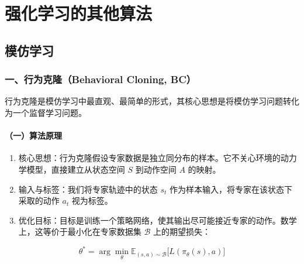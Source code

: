 \hypertarget{ux5f3aux5316ux5b66ux4e60ux7684ux5176ux4ed6ux7b97ux6cd5}{%
\chapter{强化学习的其他算法}\label{ux5f3aux5316ux5b66ux4e60ux7684ux5176ux4ed6ux7b97ux6cd5}}

\hypertarget{ux6a21ux4effux5b66ux4e60}{%
\section{模仿学习}\label{ux6a21ux4effux5b66ux4e60}}

\hypertarget{ux4e00ux884cux4e3aux514bux9686behavioral-cloning-bc}{%
\subsection{一、行为克隆（Behavioral Cloning, BC）}\label{ux4e00ux884cux4e3aux514bux9686behavioral-cloning-bc}}

行为克隆是模仿学习中最直观、最简单的形式，其核心思想是将模仿学习问题转化为一个监督学习问题。

\hypertarget{ux4e00ux7b97ux6cd5ux539fux7406}{%
\subsubsection{（一）算法原理}\label{ux4e00ux7b97ux6cd5ux539fux7406}}

\begin{enumerate}
\def\labelenumi{\arabic{enumi}.}
\item
  核心思想：行为克隆假设专家数据是独立同分布的样本。它不关心环境的动力学模型，直接建立从状态空间 \(S\) 到动作空间 \(A\) 的映射。
\item
  输入与标签：我们将专家轨迹中的状态 \(s_t\) 作为样本输入，将专家在该状态下采取的动作 \(a_t\) 视为标签。
\item
  优化目标：目标是训练一个策略网络，使其输出尽可能接近专家的动作。数学上，这等价于最小化在专家数据集 \(\mathcal{B}\) 上的期望损失：
\end{enumerate}

\[
\theta^{*}
=
\arg\min_\theta
\mathbb{E}_{(s,a)\sim\mathcal{B}}
\bigl[
L(\pi_\theta(s),a)
\bigr]
\]

